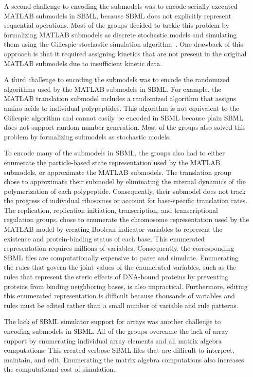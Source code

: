 \documentclass[journal,transmag]{IEEEtran}
\begin{document}
A second challenge to encoding the submodels was to encode serially-executed MATLAB submodels in SBML, because SBML does not explicitly represent sequential operations. Most of the groups decided to tackle this problem by formalizing MATLAB submodels as discrete stochastic models and simulating them using the Gillespie stochastic simulation algorithm~\cite{gillespie1977}. One drawback of this approach is that it required assigning kinetics that are not present in the original MATLAB submodels due to insufficient kinetic data.

A third challenge to encoding the submodels was to encode the randomized algorithms used by the MATLAB submodels in SBML. For example, the MATLAB translation submodel includes a randomized algorithm that assigns amino acids to individual polypeptides. This algorithm is not equivalent to the Gillespie algorithm and cannot easily be encoded in SBML because plain SBML does not support random number generation. Most of the groups also solved this problem by formalizing submodels as stochastic models.

To encode many of the submodels in SBML, the groups also had to either enumerate the particle-based state representation used by the MATLAB submodels, or approximate the MATLAB submodels. The translation group chose to approximate their submodel by eliminating the internal dynamics of the polymerization of each polypeptide. Consequently, their submodel does not track the progress of individual ribosomes or account for base-specific translation rates. The replication, replication initiation, transcription, and transcriptional regulation groups, chose to enumerate the chromosome representation used by the MATLAB model by creating Boolean indicator variables to represent the existence and protein-binding status of each base. This enumerated representation requires millions of variables. Consequently, the corresponding SBML files are computationally expensive to parse and simulate. Enumerating the rules that govern the joint values of the enumerated variables, such as the rules that represent the steric effects of DNA-bound proteins by preventing proteins from binding neighboring bases, is also impractical. Furthermore, editing this enumerated representation is difficult because thousands of variables and rules must be edited rather than a small number of variable and rule patterns.

The lack of SBML simulator support for arrays was another challenge to encoding submodels in SBML. All of the groups overcame the lack of array support by enumerating individual array elements and all matrix algebra computations. This created verbose SBML files that are difficult to interpret, maintain, and edit. Enumerating the matrix algebra computations also increases the computational cost of simulation.
\end{document}
